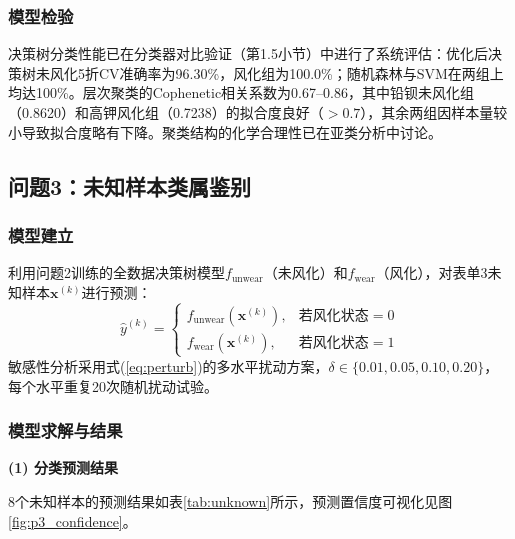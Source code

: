 \documentclass[12pt,a4paper]{ctexart}
\begin{document}
\subsubsection{模型检验}

决策树分类性能已在分类器对比验证（第1.5小节）中进行了系统评估：优化后决策树未风化5折CV准确率为96.30\%，风化组为100.0\%；随机森林与SVM在两组上均达100\%。层次聚类的Cophenetic相关系数为0.67--0.86，其中铅钡未风化组（0.8620）和高钾风化组（0.7238）的拟合度良好（$>0.7$），其余两组因样本量较小导致拟合度略有下降。聚类结构的化学合理性已在亚类分析中讨论。

\newpage

\subsection{问题3：未知样本类属鉴别}

\subsubsection{模型建立}

利用问题2训练的全数据决策树模型$f_{\text{unwear}}$（未风化）和$f_{\text{wear}}$（风化），对表单3未知样本$\mathbf{x}^{(k)}$进行预测：
\begin{equation}
    \hat{y}^{(k)} = \begin{cases}
        f_{\text{unwear}}(\mathbf{x}^{(k)}), & \text{若风化状态}=0\\
        f_{\text{wear}}(\mathbf{x}^{(k)}), & \text{若风化状态}=1
    \end{cases}
    \label{eq:pred_tree}
\end{equation}
敏感性分析采用式(\ref{eq:perturb})的多水平扰动方案，$\delta\in\{0.01,0.05,0.10,0.20\}$，每个水平重复20次随机扰动试验。

\subsubsection{模型求解与结果}

\textbf{(1) 分类预测结果}

8个未知样本的预测结果如表\ref{tab:unknown}所示，预测置信度可视化见图\ref{fig:p3_confidence}。
\end{document}
